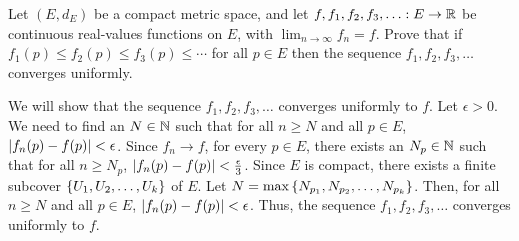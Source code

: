 \begin{problem}
  Let $(E, d_E)$ be a compact metric space, and
  let $f, f_1, f_2, f_3, \ldots : E \to \mathbb{R}$ be continuous real-values functions on $E$,
  with $\displaystyle \lim_{n \to \infty} f_n = f$.
  Prove that if $f_1(p) \leq f_2(p) \leq f_3(p) \leq \cdots$ for all $p \in E$
  then the sequence $f_1, f_2, f_3, \ldots$ converges uniformly.
\end{problem}

\begin{answer}
  We will show that the sequence $f_1, f_2, f_3, \ldots$ converges uniformly to $f$.
  Let $\epsilon > 0$.
  We need to find an $N \in \mathbb{N}$ such that for all $n \geq N$ and all $p \in E$,
  $\lvert f_n(p) - f(p)\rvert < \epsilon$.
  Since $f_n \to f$, for every $p \in E$, there exists an $N_p \in \mathbb{N}$
  such that for all $n \geq N_p$, $\lvert f_n(p) - f(p)\rvert < \frac{\epsilon}{3}$.
  Since $E$ is compact, there exists a finite subcover $\left\{U_1, U_2, \ldots, U_k\right\}$
  of $E$.
  Let $N = \max \left\{N_{p_1}, N_{p_2}, \ldots, N_{p_k}\right\}$.
  Then, for all $n \geq N$ and all $p \in E$, $\lvert f_n(p) - f(p)\rvert < \epsilon$.
  Thus, the sequence $f_1, f_2, f_3, \ldots$ converges uniformly to $f$.
\end{answer}
